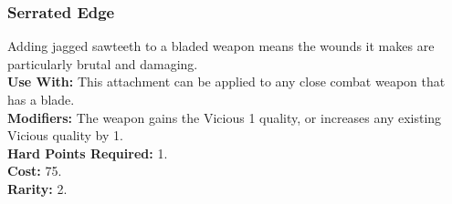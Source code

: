 \subsubsection{Serrated Edge}
Adding jagged sawteeth to a bladed weapon means the
wounds it makes are particularly brutal and damaging.\\
\textbf{Use With:} This attachment can be applied to any close
    combat weapon that has a blade.\\
\textbf{Modifiers:} The weapon gains the Vicious 1 quality, or
    increases any existing Vicious quality by 1.\\
\textbf{Hard Points Required:} 1.\\
\textbf{Cost:} 75.\\
\textbf{Rarity:} 2.\\
